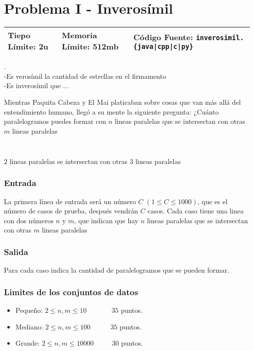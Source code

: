 \chapter*{Problema I - Inverosímil}

\begin{center}
  \begin{tabular}{ | l | l | l | }
    \hline
    Tiepo Límite: 2u & Memoria Límite: 512mb & Código Fuente: \texttt{inverosimil.\{java|cpp|c|py\}} \\
    \hline
  \end{tabular}
\end{center}

 .\\
-Es verosímil la cantidad de estrellas en el firmamento \\
-Es inverosímil que ...

Mientras Paquita Cabeza y El Mai platicaban sobre cosas que van más allá del entendimiento humano, llegó a su mente la siguiente pregunta: ¿Cuánto paralelogramos puedes formar con $n$ lineas paralelas que se intersectan con otras $m$ lineas paralelas
\subsection*{}
\\
$2$ lineas paralelas se intersectan con otras $3$ lineas paralelas
\subsection*{Entrada}

La primera línea de entrada será un número $C$ $(1 \leq  C\leq 1000)$, que es el número de casos de prueba, después vendrán $C$ casos. Cada caso tiene una linea con dos números $n$ y $m$, que indican que hay $n$ lineas paralelas que se intersectan con otras $m$ lineas paralelas

\subsection*{Salida}
Para cada caso indica la cantidad de paralelogramos que se pueden formar.

\subsection*{Limites de los conjuntos de datos}
\begin{itemize}
    \item Pequeño: $ 2\leq n,m \leq 10  $ $\quad \quad \quad$ $35$ puntos.
    \item Mediano: $ 2\leq n,m \leq 100  $ $\quad \quad \;$ $35$ puntos.
    \item Grande: $ 2\leq n,m \leq 10000  $ $\quad \quad$ $30$ puntos.
\end{itemize}

